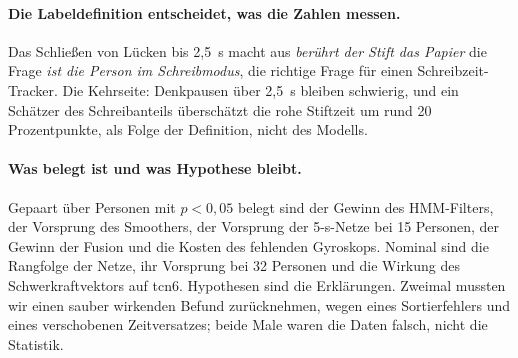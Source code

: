 \paragraph{Die Labeldefinition entscheidet, was die Zahlen messen.} Das
Schließen von Lücken bis 2,5~s macht aus \emph{berührt der Stift das Papier}
die Frage \emph{ist die Person im Schreibmodus}, die richtige Frage für einen
Schreibzeit-Tracker. Die Kehrseite: Denkpausen über 2,5~s bleiben schwierig,
und ein Schätzer des Schreibanteils überschätzt die rohe Stiftzeit um rund 20
Prozentpunkte, als Folge der Definition, nicht des Modells.

\paragraph{Was belegt ist und was Hypothese bleibt.} Gepaart über Personen
mit $p < 0{,}05$ belegt sind der Gewinn des HMM-Filters, der Vorsprung des
Smoothers, der Vorsprung der 5-s-Netze bei 15 Personen, der Gewinn der
Fusion und die Kosten des fehlenden Gyroskops. Nominal sind die Rangfolge der
Netze, ihr Vorsprung bei 32 Personen und die Wirkung des Schwerkraftvektors
auf tcn6. Hypothesen sind die Erklärungen. Zweimal mussten wir einen sauber
wirkenden Befund zurücknehmen, wegen eines Sortierfehlers und eines
verschobenen Zeitversatzes; beide Male waren die Daten falsch, nicht die
Statistik.
